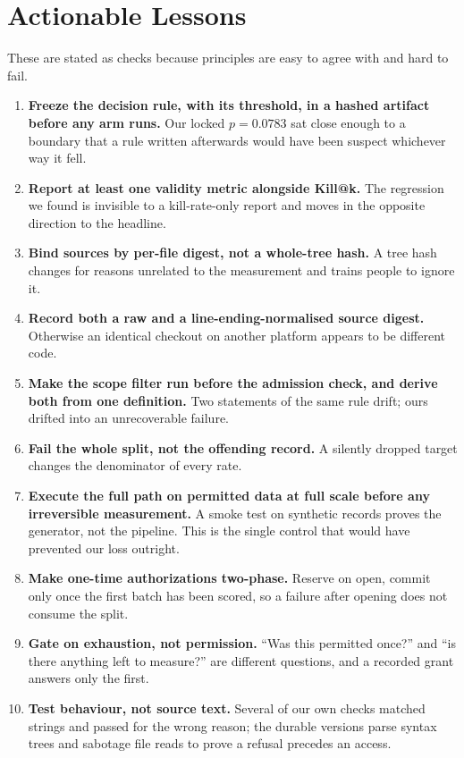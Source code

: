 \documentclass[10pt,conference]{IEEEtran}
\makeatletter
\newcommand{\killk}[1]{Kill@#1}
\makeatother
\begin{document}
\section{Actionable Lessons}
\label{sec:lessons}

These are stated as checks because principles are easy to agree with and hard to
fail.

\begin{enumerate}
  \item \textbf{Freeze the decision rule, with its threshold, in a hashed
        artifact before any arm runs.} Our locked $p = 0.0783$ sat close enough
        to a boundary that a rule written afterwards would have been suspect
        whichever way it fell.
  \item \textbf{Report at least one validity metric alongside \killk{k}.} The
        regression we found is invisible to a kill-rate-only report and moves in
        the opposite direction to the headline.
  \item \textbf{Bind sources by per-file digest, not a whole-tree hash.} A
        tree hash changes for reasons unrelated to the measurement and trains
        people to ignore it.
  \item \textbf{Record both a raw and a line-ending-normalised source digest.}
        Otherwise an identical checkout on another platform appears to be
        different code.
  \item \textbf{Make the scope filter run before the admission check, and
        derive both from one definition.} Two statements of the same rule drift;
        ours drifted into an unrecoverable failure.
  \item \textbf{Fail the whole split, not the offending record.} A silently
        dropped target changes the denominator of every rate.
  \item \textbf{Execute the full path on permitted data at full scale before any
        irreversible measurement.} A smoke test on synthetic records proves the
        generator, not the pipeline. This is the single control that would have
        prevented our loss outright.
  \item \textbf{Make one-time authorizations two-phase.} Reserve on open, commit
        only once the first batch has been scored, so a failure after opening
        does not consume the split.
  \item \textbf{Gate on exhaustion, not permission.} ``Was this permitted
        once?'' and ``is there anything left to measure?'' are different
        questions, and a recorded grant answers only the first.
  \item \textbf{Test behaviour, not source text.} Several of our own checks
        matched strings and passed for the wrong reason; the durable versions
        parse syntax trees and sabotage file reads to prove a refusal precedes
        an access.
\end{enumerate}
\end{document}
